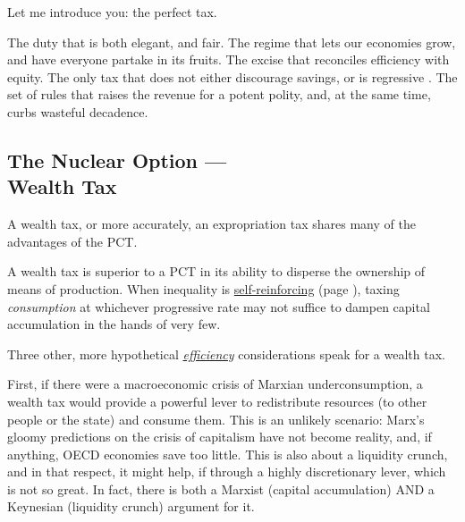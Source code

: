 Let me introduce you:
the perfect tax.

The duty that is both elegant, and fair.
The regime that lets our economies grow, and have everyone partake in its fruits.
The excise that reconciles efficiency with equity.
The only tax that does not either discourage savings, or is regressive \citep[2]{Seidman1997}.
The set of rules that raises the revenue for a potent polity, and, at the same time, curbs wasteful decadence.

\subsection[Wealth Tax]{The Nuclear Option ---\\Wealth Tax}
	\label{sec:ScoreWT}
A wealth tax, or more accurately, an expropriation tax shares many of the advantages of the PCT.

A wealth tax is superior to a PCT in its ability to disperse the ownership of means of production.
When inequality is \hyperref[sec:inequality-dynamics]{self-reinforcing} (page \pageref{sec:inequality-dynamics}), taxing \emph{consumption} at whichever progressive rate may not suffice to dampen capital accumulation in the hands of very few.

Three other, more hypothetical \hyperref[sec:tax-optimality]{\emph{efficiency}} considerations speak for a wealth tax.

First, if there were a macroeconomic crisis of Marxian %
underconsumption, a wealth tax would provide a powerful lever to redistribute resources (to other people or the state) and consume them.
This is an unlikely scenario:
Marx's gloomy predictions on the crisis of capitalism have not become reality, and, if anything, OECD economies save too little.
This is also about a liquidity crunch, and in that respect, it might help, if through a highly discretionary lever, which is not so great.
In fact, there is both a Marxist (capital accumulation) AND a Keynesian (liquidity crunch) argument for it.

